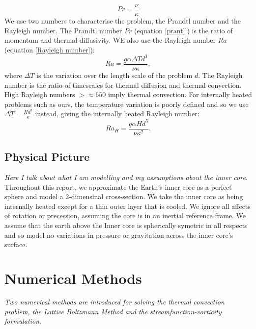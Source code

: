\documentclass{article}
\begin{document}
\begin{equation}
	Pr = \frac{\nu}{\kappa}
	\label{prantl}
\end{equation}
We use two numbers to characterise the problem, the Prandtl number and the Rayleigh number. The Prandtl number $Pr$ (equation \ref{prantl}) is the ratio 
of momentum and thermal diffusivity. WE also use the Rayleigh number $Ra$ (equation \ref{Rayleigh number}):
\begin{equation}
	Ra = \frac{g \alpha \Delta T  d^3}{\nu \kappa},
\end{equation}
where $\Delta T$ is the variation over the length scale of the problem $d$. The Rayleigh number is the ratio of timescales for thermal diffusion and 
thermal convection. High Rayleigh numbers $>\approx 650$ imply thermal convection. For internally heated problems such as ours, the temperature 
variation is poorly defined and so we use $\Delta T = \frac{H d^2}{\kappa}$ instead, giving the internally heated Rayleigh number:
\begin{equation}
	Ra_{H} = \frac{g \alpha H d^5}{\nu {\kappa}^2}.
	\label{internally heated rayleigh number}
\end{equation}



\subsection*{Physical Picture}
{\it{Here I talk about what I am modelling and my assumptions about the inner core.}}
Throughout this report, we approximate the Earth's inner core as a perfect sphere and model a 2-dimensinal cross-section. We take the inner core as being internally heated except for a thin outer layer that is cooled. We ignore all affects of rotation or precession, assuming the core is in an inertial reference frame. We assume that the earth above the Inner core is spherically symetric in all respects and so model no variations in pressure or gravitation across the inner core's surface.


\section*{Numerical Methods}
{\it{Two numerical methods are introduced for solving the thermal convection problem, the Lattice Boltzmann Method and the streamfunction-vorticity formulation.}}
\end{document}
